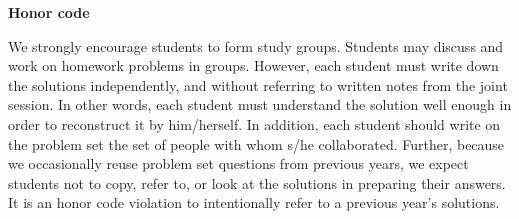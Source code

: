 {\bf Honor code}

We strongly encourage students to form study groups. Students may discuss and
work on homework problems in groups. However, each student must write down the
solutions independently, and without referring to written notes from the joint
session. In other words, each student must understand the solution well enough
in order to reconstruct it by him/herself. In addition, each student should
write on the problem set the set of people with whom s/he collaborated. Further,
because we occasionally reuse problem set questions from previous years, we
expect students not to copy, refer to, or look at the solutions in preparing
their answers. It is an honor code violation to intentionally refer to a
previous year's solutions.
